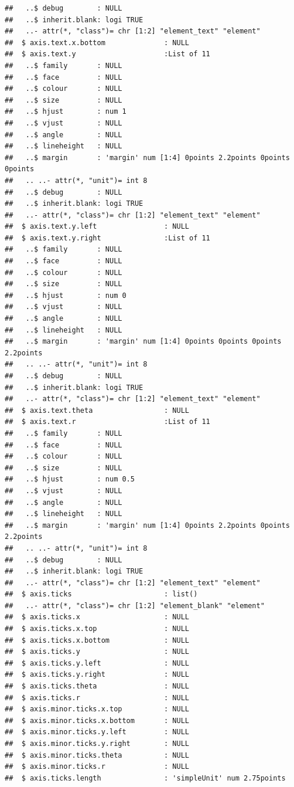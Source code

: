 \documentclass[
  12pt,
]{article}
\begin{document}
\begin{verbatim}
##   ..$ debug        : NULL
##   ..$ inherit.blank: logi TRUE
##   ..- attr(*, "class")= chr [1:2] "element_text" "element"
##  $ axis.text.x.bottom              : NULL
##  $ axis.text.y                     :List of 11
##   ..$ family       : NULL
##   ..$ face         : NULL
##   ..$ colour       : NULL
##   ..$ size         : NULL
##   ..$ hjust        : num 1
##   ..$ vjust        : NULL
##   ..$ angle        : NULL
##   ..$ lineheight   : NULL
##   ..$ margin       : 'margin' num [1:4] 0points 2.2points 0points 0points
##   .. ..- attr(*, "unit")= int 8
##   ..$ debug        : NULL
##   ..$ inherit.blank: logi TRUE
##   ..- attr(*, "class")= chr [1:2] "element_text" "element"
##  $ axis.text.y.left                : NULL
##  $ axis.text.y.right               :List of 11
##   ..$ family       : NULL
##   ..$ face         : NULL
##   ..$ colour       : NULL
##   ..$ size         : NULL
##   ..$ hjust        : num 0
##   ..$ vjust        : NULL
##   ..$ angle        : NULL
##   ..$ lineheight   : NULL
##   ..$ margin       : 'margin' num [1:4] 0points 0points 0points 2.2points
##   .. ..- attr(*, "unit")= int 8
##   ..$ debug        : NULL
##   ..$ inherit.blank: logi TRUE
##   ..- attr(*, "class")= chr [1:2] "element_text" "element"
##  $ axis.text.theta                 : NULL
##  $ axis.text.r                     :List of 11
##   ..$ family       : NULL
##   ..$ face         : NULL
##   ..$ colour       : NULL
##   ..$ size         : NULL
##   ..$ hjust        : num 0.5
##   ..$ vjust        : NULL
##   ..$ angle        : NULL
##   ..$ lineheight   : NULL
##   ..$ margin       : 'margin' num [1:4] 0points 2.2points 0points 2.2points
##   .. ..- attr(*, "unit")= int 8
##   ..$ debug        : NULL
##   ..$ inherit.blank: logi TRUE
##   ..- attr(*, "class")= chr [1:2] "element_text" "element"
##  $ axis.ticks                      : list()
##   ..- attr(*, "class")= chr [1:2] "element_blank" "element"
##  $ axis.ticks.x                    : NULL
##  $ axis.ticks.x.top                : NULL
##  $ axis.ticks.x.bottom             : NULL
##  $ axis.ticks.y                    : NULL
##  $ axis.ticks.y.left               : NULL
##  $ axis.ticks.y.right              : NULL
##  $ axis.ticks.theta                : NULL
##  $ axis.ticks.r                    : NULL
##  $ axis.minor.ticks.x.top          : NULL
##  $ axis.minor.ticks.x.bottom       : NULL
##  $ axis.minor.ticks.y.left         : NULL
##  $ axis.minor.ticks.y.right        : NULL
##  $ axis.minor.ticks.theta          : NULL
##  $ axis.minor.ticks.r              : NULL
##  $ axis.ticks.length               : 'simpleUnit' num 2.75points

\end{verbatim}
\end{document}
